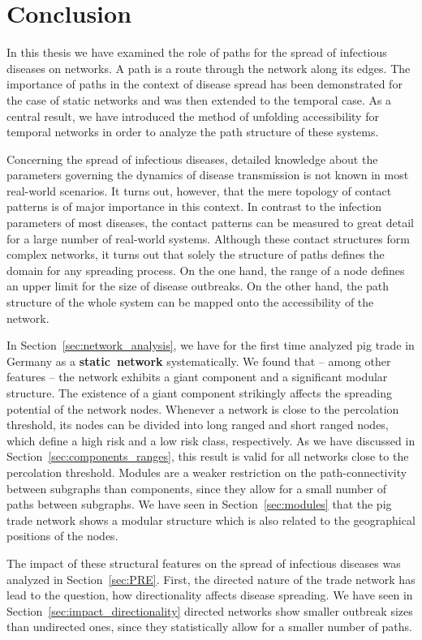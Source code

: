 \chapter{Conclusion}
In this thesis we have examined the role of paths for the spread of infectious diseases on networks.
A path is a route through the network along its edges.
The importance of paths in the context of disease spread has been demonstrated for the case of static networks and was then extended to the temporal case.
As a central result, we have introduced the method of unfolding accessibility for temporal networks in order to analyze the path structure of these systems.

Concerning the spread of infectious diseases, detailed knowledge about the parameters governing the dynamics of disease transmission is not known in most real-world scenarios.
It turns out, however, that the mere topology of contact patterns is of major importance in this context.
In contrast to the infection parameters of most diseases, the contact patterns can be measured to great detail for a large number of real-world systems.
Although these contact structures form complex networks, it turns out that solely the structure of paths defines the domain for any spreading process.
On the one hand, the range of a node defines an upper limit for the size of disease outbreaks.
On the other hand, the path structure of the whole system can be mapped onto the accessibility of the network.

In Section~\ref{sec:network_analysis}, we have for the first time analyzed pig trade in Germany as a \textbf{static~network} systematically.
We found that -- among other features -- the network exhibits a giant component and a significant modular structure.
The existence of a giant component strikingly affects the spreading potential of the network nodes.
Whenever a network is close to the percolation threshold, its nodes can be divided into long ranged and short ranged nodes, which define a high risk and a low risk class, respectively.
As we have discussed in Section~\ref{sec:components_ranges}, this result is valid for all networks close to the percolation threshold.
Modules are a weaker restriction on the path-connectivity between subgraphs than components, since they allow for a small number of paths between subgraphs.
We have seen in Section~\ref{sec:modules} that the pig trade network shows a modular structure which is also related to the geographical positions of the nodes.

The impact of these structural features on the spread of infectious diseases was analyzed in Section~\ref{sec:PRE}.
First, the directed nature of the trade network has lead to the question, how directionality affects disease spreading.
We have seen in Section~\ref{sec:impact_directionality} directed networks show smaller outbreak sizes than undirected ones, since they statistically allow for a smaller number of paths.

